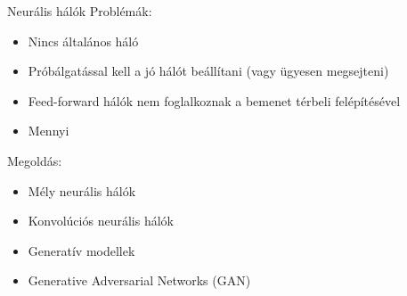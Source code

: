 \begin{frame}{Neurális hálók}
    Problémák:
    \begin{itemize}
        \item Nincs általános háló
        \item Próbálgatással kell a jó hálót beállítani (vagy ügyesen megsejteni)
        \item Feed-forward hálók nem foglalkoznak a bemenet térbeli felépítésével
        \item Mennyi 
    \end{itemize}
    
    Megoldás: 
    \begin{itemize}
        \item Mély neurális hálók
        \item Konvolúciós neurális hálók
        \item Generatív modellek
        \item Generative Adversarial Networks (GAN)
    \end{itemize}
\end{frame}


